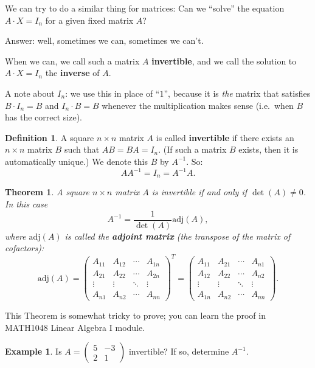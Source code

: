 \documentclass[
  english,
  12pt,
  oneside]{book}
\newtheorem{theorem}{Theorem}[chapter]
\theoremstyle{definition}
\newtheorem{definition}{Definition}[chapter]
\theoremstyle{definition}
\newtheorem{example}{Example}[chapter]
\theoremstyle{definition}
\theoremstyle{definition}
\theoremstyle{remark}
\begin{document}
We can try to do a similar thing for matrices: Can we ``solve'' the equation \(A\cdot X=I_n\) for a given fixed matrix \(A\)?

Answer: well, sometimes we can, sometimes we can't.

When we can, we call such a matrix \(A\) \textbf{invertible}, and we call the solution to \(A\cdot X=I_n\) the \textbf{inverse} of \(A\).

A note about \(I_n\): we use this in place of ``\(1\)'', because it is \emph{the} matrix that satisfies \(B\cdot I_n=B\) and \(I_n\cdot B=B\) whenever the multiplication makes sense (i.e.~when \(B\) has the correct size).

\begin{definition}
A square \(n\times n\) matrix \(A\) is called \textbf{invertible} if there exists an \(n\times n\) matrix \(B\) such that \(AB=BA=I_n\). (If such a matrix \(B\) exists, then it is automatically unique.) We denote this \(B\) by \(A^{-1}\). So:
\[AA^{-1}=I_n=A^{-1}A.\]
\end{definition}

\begin{theorem}
A square \(n\times n\) matrix \(A\) is invertible if and only if \(\det(A)\not=0\). In this case
\[\boxed{A^{-1} = \frac{1}{\det(A)}\mathrm{adj}(A)},\]
where \(\mathrm{adj}(A)\) is called the \textbf{adjoint matrix} (the transpose of the matrix of cofactors):
\[\mathrm{adj}(A) = \begin{pmatrix}
    A_{11} & A_{12} & \cdots & A_{1n}\\
    A_{21} & A_{22} & \cdots & A_{2n}\\
    \vdots & \vdots & \ddots & \vdots\\
    A_{n1} & A_{n2} & \cdots & A_{nn}
\end{pmatrix}^T = \begin{pmatrix}
    A_{11} & A_{21} & \cdots & A_{n1}\\
    A_{12} & A_{22} & \cdots & A_{n2}\\
    \vdots & \vdots & \ddots & \vdots\\
    A_{1n} & A_{n2} & \cdots & A_{nn}
\end{pmatrix}.\]
\end{theorem}

This Theorem is somewhat tricky to prove; you can learn the proof in MATH1048 Linear Algebra I module.

\begin{example}
Is \(A=\begin{pmatrix}5&-3\\2&1\end{pmatrix}\) invertible? If so, determine \(A^{-1}\).
\end{example}
\end{document}

